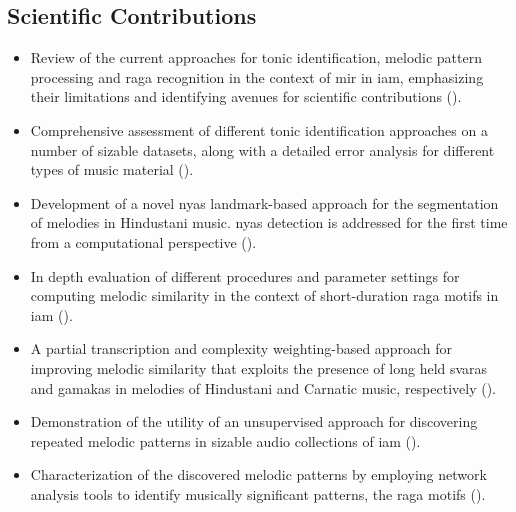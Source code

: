\subsection*{Scientific Contributions}

\begin{itemize}
	
	\item Review of the current approaches for tonic identification, melodic pattern processing and \gls{raga} recognition in the context of \gls{mir} in \gls{iam}, emphasizing their limitations and identifying avenues for scientific contributions ().
	
	\item Comprehensive assessment of different tonic identification approaches on a number of sizable datasets, along with a detailed error analysis for different types of music material ().
	
	\item Development of a novel \gls{nyas} landmark-based approach for the segmentation of melodies in Hindustani music. \Gls{nyas} detection is addressed for the first time from a computational perspective ().
	
	\item In depth evaluation of different procedures and parameter settings for computing melodic similarity in the context of short-duration \gls{raga} motifs in \gls{iam} (). 
	
	\item A partial transcription and complexity weighting-based approach for improving melodic similarity that exploits the presence of long held \glspl{svara} and \glspl{gamaka} in melodies of Hindustani and Carnatic music, respectively ().
	
	\item Demonstration of the utility of an unsupervised approach for discovering repeated melodic patterns in sizable audio collections of \gls{iam} ().
	
	\item Characterization of the discovered melodic patterns by employing network analysis tools to identify musically significant patterns, the \gls{raga} motifs (). 
	

\end{itemize}
